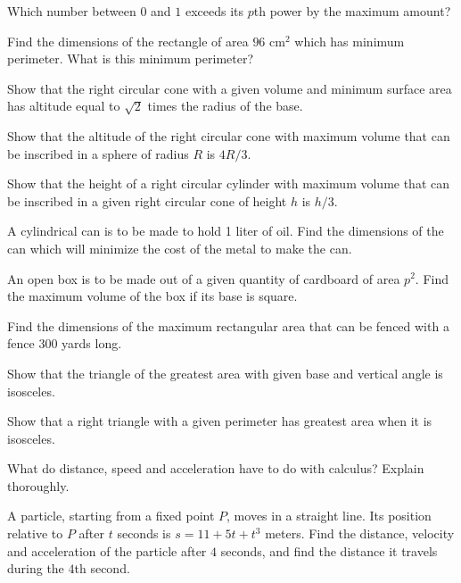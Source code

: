\begin{multicols}{2}
  \problem Which number between $0$ and $1$ exceeds its $p$th power by the
  maximum amount?




  \problem Find the dimensions of the rectangle of area $96$ cm${}^2$ which
  has minimum perimeter.  What is this minimum perimeter?




  \problem Show that the right circular cone with a given volume and minimum
  surface area has altitude equal to $\sqrt{2}$ times the radius of the base.




  \problem Show that the altitude of the right circular cone with maximum
  volume that can be inscribed in a sphere of radius $R$ is $4R/3$.




  \problem Show that the height of a right circular cylinder with maximum
  volume that can be inscribed in a given right circular cone of height $h$
  is $h/3$.




  \problem A cylindrical can is to be made to hold 1 liter of oil.  Find the
  dimensions of the can which will minimize the cost of the metal to make the
  can.




  \problem An open box is to be made out of a given quantity of cardboard of
  area $p^2$.  Find the maximum volume of the box if its base is square.





  \problem Find the dimensions of the maximum rectangular area that can be
  fenced with a fence 300 yards long.




  \problem Show that the triangle of the greatest area with given base and
  vertical angle is isosceles.




  \problem Show that a right triangle with a given perimeter has greatest
  area when it is isosceles.



  \problem What do distance, speed and acceleration have to do with calculus?
  Explain thoroughly.




  \problem A particle, starting from a fixed point $P$, moves in a straight
  line.  Its position relative to $P$ after $t$ seconds is $s=11+5t+t^3$
  meters.  Find the distance, velocity and acceleration of the particle after
  $4$ seconds, and find the distance it travels during the $4$th second.





\end{multicols}
